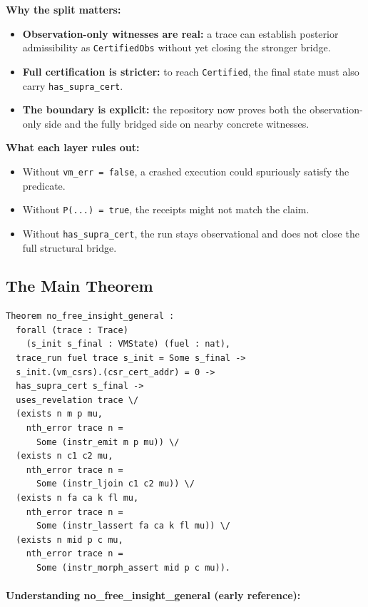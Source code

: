 \textbf{Why the split matters:}
\begin{itemize}
  \item \textbf{Observation-only witnesses are real:} a trace can establish posterior admissibility as \texttt{CertifiedObs} without yet closing the stronger bridge.
  \item \textbf{Full certification is stricter:} to reach \texttt{Certified}, the final state must also carry \texttt{has\_supra\_cert}.
  \item \textbf{The boundary is explicit:} the repository now proves both the observation-only side and the fully bridged side on nearby concrete witnesses.
\end{itemize}

\textbf{What each layer rules out:}
\begin{itemize}
    \item Without \texttt{vm\_err = false}, a crashed execution could spuriously satisfy the predicate.
  \item Without \texttt{P(...) = true}, the receipts might not match the claim.
  \item Without \texttt{has\_supra\_cert}, the run stays observational and does not close the full structural bridge.
\end{itemize}


\subsection{The Main Theorem}

\begin{theorem}
\begin{lstlisting}
Theorem no_free_insight_general :
  forall (trace : Trace)
    (s_init s_final : VMState) (fuel : nat),
  trace_run fuel trace s_init = Some s_final ->
  s_init.(vm_csrs).(csr_cert_addr) = 0 ->
  has_supra_cert s_final ->
  uses_revelation trace \/
  (exists n m p mu,
    nth_error trace n =
      Some (instr_emit m p mu)) \/
  (exists n c1 c2 mu,
    nth_error trace n =
      Some (instr_ljoin c1 c2 mu)) \/
  (exists n fa ca k fl mu,
    nth_error trace n =
      Some (instr_lassert fa ca k fl mu)) \/
  (exists n mid p c mu,
    nth_error trace n =
      Some (instr_morph_assert mid p c mu)).
\end{lstlisting}
\end{theorem}

\paragraph{Understanding no\_free\_insight\_general (early reference):}

